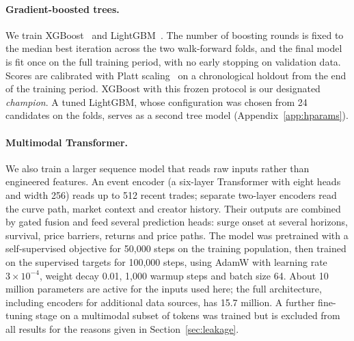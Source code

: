 \paragraph{Gradient-boosted trees.}
We train XGBoost~\citep{chen2016xgboost} and LightGBM~\citep{ke2017lightgbm}. The number of boosting rounds is fixed to the median best iteration across the two walk-forward folds, and the final model is fit once on the full training period, with no early stopping on validation data. Scores are calibrated with Platt scaling~\citep{platt1999probabilistic} on a chronological holdout from the end of the training period. XGBoost with this frozen protocol is our designated \emph{champion}. A tuned LightGBM, whose configuration was chosen from 24 candidates on the folds, serves as a second tree model (Appendix~\ref{app:hparams}).

\paragraph{Multimodal Transformer.}
We also train a larger sequence model that reads raw inputs rather than engineered features. An event encoder (a six-layer Transformer with eight heads and width 256) reads up to 512 recent trades; separate two-layer encoders read the curve path, market context and creator history. Their outputs are combined by gated fusion and feed several prediction heads: surge onset at several horizons, survival, price barriers, returns and price paths. The model was pretrained with a self-supervised objective for 50,000 steps on the training population, then trained on the supervised targets for 100,000 steps, using AdamW with learning rate $3\times10^{-4}$, weight decay 0.01, 1,000 warmup steps and batch size 64. About 10 million parameters are active for the inputs used here; the full architecture, including encoders for additional data sources, has 15.7 million. A further fine-tuning stage on a multimodal subset of tokens was trained but is excluded from all results for the reasons given in Section~\ref{sec:leakage}.
